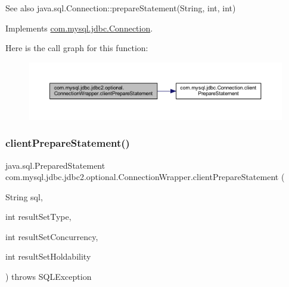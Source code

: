 \begin{DoxySeeAlso}{See also}
java.\+sql.\+Connection\+::prepare\+Statement(\+String, int, int) 
\end{DoxySeeAlso}


Implements \mbox{\hyperlink{interfacecom_1_1mysql_1_1jdbc_1_1_connection_a3d058c3722d0afd1cdc4254a9b813c74}{com.\+mysql.\+jdbc.\+Connection}}.

Here is the call graph for this function\+:
\nopagebreak
\begin{figure}[H]
\begin{center}
\leavevmode
\includegraphics[width=350pt]{classcom_1_1mysql_1_1jdbc_1_1jdbc2_1_1optional_1_1_connection_wrapper_ad71fc526adef4d300477c03514b998c2_cgraph}
\end{center}
\end{figure}
\mbox{\label{classcom_1_1mysql_1_1jdbc_1_1jdbc2_1_1optional_1_1_connection_wrapper_a546e049a9b2f6741d15e1e1bdbe31292}} 
\subsubsection{\texorpdfstring{client\+Prepare\+Statement()}{clientPrepareStatement()}\hspace{0.1cm}{\footnotesize\ttfamily [4/6]}}
{\footnotesize\ttfamily java.\+sql.\+Prepared\+Statement com.\+mysql.\+jdbc.\+jdbc2.\+optional.\+Connection\+Wrapper.\+client\+Prepare\+Statement (\begin{DoxyParamCaption}\item[{String}]{sql,  }\item[{int}]{result\+Set\+Type,  }\item[{int}]{result\+Set\+Concurrency,  }\item[{int}]{result\+Set\+Holdability }\end{DoxyParamCaption}) throws S\+Q\+L\+Exception}

